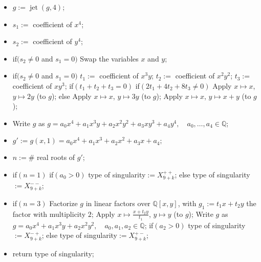 \documentclass{amsproc}
\DeclareMathOperator{\jt}{jet}
\begin{document}
\begin{itemize}
\item $g:=\jt(g,4)$;
\item $s_1:=$ coefficient of ${x^4}$;
\item $s_2:=$ coefficient of ${y^4}$;
\item if$(s_2\neq0$ and $s_1=0)$\newline
\phantom{}\quad Swap the variables $x$ and $y$;\newline
\item if$(s_2\neq0$ and $s_1=0)$\newline
\phantom{}\quad $t_1:=$ coefficient of ${x^3y}$;\newline
\phantom{}\quad $t_2:=$ coefficient of ${x^2y^2}$;\newline
\phantom{}\quad $t_3:=$ coefficient of ${xy^3}$;\newline
\phantom{}\quad if$(t_1+t_2+t_3=0)$\newline
\phantom{}\quad\quad if$(2t_1+4t_2+8t_3\neq0)$\newline
\phantom{}\quad\quad\quad Apply $x\mapsto x$, $y\mapsto 2y$ (to $g$);\newline
\phantom{}\quad\quad else\newline
\phantom{}\quad\quad\quad Apply $x\mapsto x$, $y\mapsto 3y$ (to $g$);\newline
\phantom{}\quad Apply $x\mapsto x$, $y\mapsto x+y$ (to $g$);
\item Write $g$ as $g=a_0x^4+a_1x^3y+a_2x^2y^2+a_3xy^3+a_4y^4,\quad a_0,\ldots,a_4\in\mathbb Q$;
\item $g':=g(x,1)=a_0x^4+a_1x^3+a_2x^2+a_3x+a_4;$
\item $n:=\#$ real roots of $g'$;
\item if$(n=1)$\newline
\phantom{}\quad if$(a_0>0)$\newline
\phantom{}\quad\quad type of singularity$ :=X_{9+k}^{++}$;\newline
\phantom{}\quad else\newline
\phantom{}\quad\quad type of singularity$ := X_{9+k}^{--}$;
\item if$(n=3)$\newline
\phantom{}\quad Factorize $g$ in linear factors over $\mathbb Q[x,y]$,
with $g_1:=t_1x+t_2y$ the factor\newline
\phantom{}\quad with multiplicity $2$;\newline
\phantom{}\quad Apply $x\mapsto\frac{x+t_2y}{t_1}$, $y\mapsto y$ (to $g$);\newline
\phantom{}\quad Write $g$ as $g=a_0x^4+a_1x^3y+a_2x^2y^2,\quad a_0,a_1,a_2\in\mathbb Q$;\newline
\phantom{}\quad if$(a_2>0)$\newline
\phantom{}\quad\quad type of singularity$ := X_{9+k}^{-+}$;\newline
\phantom{}\quad else\newline
\phantom{}\quad\quad type of singularity$ := X_{9+k}^{+-}$;
\item return type of singularity;
\end{itemize}
\end{document}
